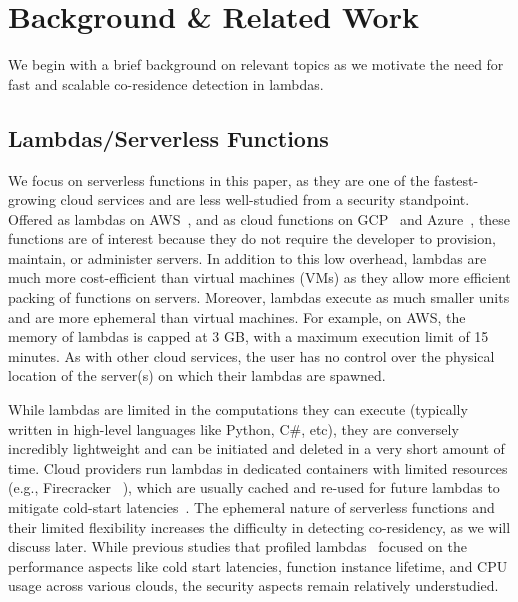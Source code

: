 \section{Background \& Related Work}
\label{sec:background}


We begin with a brief background on relevant topics as we motivate the need for
fast and scalable co-residence detection in lambdas.

\subsection{Lambdas/Serverless Functions} 
\label{sec:background:lambdas}

We focus on serverless functions in this paper, as they are one of the
fastest-growing cloud services and are less well-studied from a security
standpoint. Offered as lambdas on AWS~\cite{awslambda}, and as cloud functions
on GCP~\cite{gcpfunctions} and Azure~\cite{azurefunctions}, these functions are
of interest because they do not require the developer to provision, maintain, or
administer servers. In addition to this low overhead, lambdas are much more
cost-efficient than virtual machines (VMs) as they allow more efficient packing
of functions on servers. Moreover, lambdas execute as much smaller units  and
are more ephemeral than virtual machines.  For example, on AWS,
the memory of lambdas is capped at 3 GB, with a maximum execution limit of 15
minutes.  As with other cloud services, the user has no control over the
physical location of the server(s) on which their lambdas are spawned.

While lambdas are limited in the computations they can execute (typically
written in high-level languages like Python, C\#, etc), they are conversely
incredibly lightweight and can be initiated and deleted in a very short amount
of time. Cloud providers run lambdas in dedicated containers with limited
resources (e.g., Firecracker ~\cite{firecracker}), which are usually cached and
re-used for future lambdas to mitigate cold-start
latencies~\cite{awscontainerreuse}. The ephemeral nature of serverless functions
and their limited flexibility increases the difficulty in detecting
co-residency, as we will discuss later. While previous studies that profiled
lambdas~\cite{wangusenix2018} focused on the performance aspects like cold start
latencies, function instance lifetime, and CPU usage across various clouds,
the security aspects remain relatively understudied.


